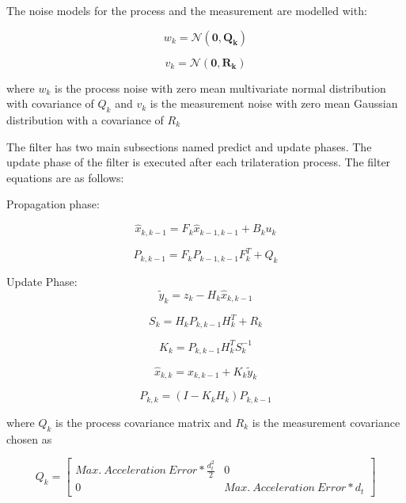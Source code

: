The noise models for the process and the measurement are modelled with:

\begin{equation}
 w_k = \mathcal{N}(\mathbf{0,Q_k})
\end{equation}
	
\begin{equation}
v_k = \mathcal{N}(\mathbf{0,R_k})
\end{equation}
		
where $w_k$ is the process noise with zero mean multivariate normal distribution with covariance of $Q_k$ and $v_k$ is the measurement noise with zero mean Gaussian distribution with a covariance of $R_k$
		
The filter has two main subsections named predict and update phases. The update phase of the filter is executed after each trilateration process. The filter equations are as follows:
		
Propagation phase:

\begin{equation}
\hat{x}_{k,k-1} = F_k\hat{x}_{k-1,k-1} + B_ku_k
\end{equation}
		
\begin{equation}
 P_{k,k-1} = F_k P_{k-1,k-1}F^T_k + Q_k
\end{equation}
		
Update Phase:
\begin{equation}
\tilde{y}_k = z_k - H_k  \hat{x}_{k,k-1} 
\end{equation}

\begin{equation}
S_k = H_k P_{k,k-1} H^T_k + R_k
\end{equation}

\begin{equation}
K_k =  P_{k,k-1} H^T_kS_k^{-1}
\end{equation}
		
\begin{equation}
 \hat{x}_{k,k} =  \hat{x}_{k,k-1} + K_k \tilde{y}_k
\end{equation}
		
\begin{equation}
P_{k,k} = (I - K_kH_k)P_{k,k-1}
\end{equation}
		
where $Q_k$ is the process covariance matrix and $R_k$ is the measurement covariance chosen as 

\begin{equation}
Q_k = \begin{bmatrix}
Max.\ Acceleration\ Error * \frac{d^2_t}{2} & 0 \\
0 & Max.\ Acceleration\ Error * d_t
\end{bmatrix}
\end{equation}
		
